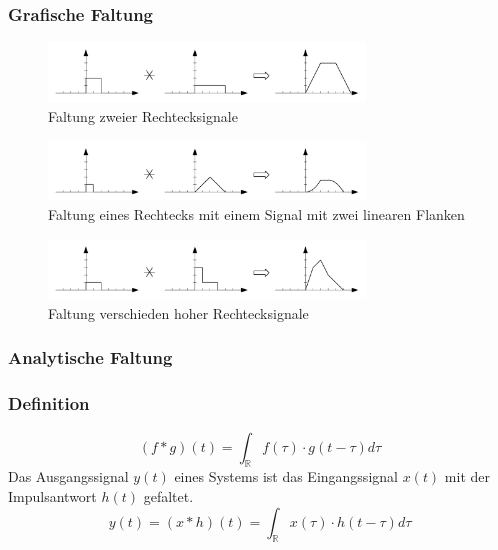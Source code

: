\documentclass[10pt,a4paper]{article}
\begin{document}
\subsubsection*{Grafische Faltung}
\begin{figure}[H]
	\centering
	\includegraphics[width=0.75\textwidth]{img/faltung1.pdf}
	\caption*{Faltung zweier Rechtecksignale}
\end{figure}
\begin{figure}[H]
	\centering
	\includegraphics[width=0.75\textwidth]{img/faltung2.pdf}
	\caption*{Faltung eines Rechtecks mit einem Signal mit zwei linearen Flanken}
\end{figure}
\begin{figure}[H]
	\centering
	\includegraphics[width=0.75\textwidth]{img/faltung3.pdf}
	\caption*{Faltung verschieden hoher Rechtecksignale}
\end{figure}
\subsubsection*{Analytische Faltung}
\subsubsection*{Definition}
\[ (f \ast g)(t)=\int_\mathbb{R}f(\tau)\cdot g(t-\tau) d\tau \]
Das Ausgangssignal $y(t)$ eines Systems ist das Eingangssignal $x(t)$ mit der Impulsantwort $h(t)$ gefaltet.
\[ y(t) = (x \ast h)(t)=\int_\mathbb{R}x(\tau)\cdot h(t-\tau) d\tau\]
\end{document}
